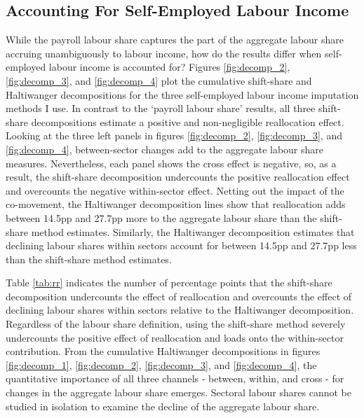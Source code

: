 \subsection{Accounting For Self-Employed Labour Income}

While the payroll labour share captures the part of the aggregate labour share accruing unambiguously to labour income, how do the results differ when self-employed labour income is accounted for? Figures \ref{fig:decomp_2}, \ref{fig:decomp_3}, and \ref{fig:decomp_4} plot the cumulative shift-share and Haltiwanger decompositions for the three self-employed labour income imputation methods I use. In contrast to the `payroll labour share' results, all three shift-share decompositions estimate a positive and non-negligible reallocation effect. Looking at the three left panels in figures \ref{fig:decomp_2}, \ref{fig:decomp_3}, and \ref{fig:decomp_4}, between-sector changes add to the aggregate labour share measures. Nevertheless, each panel shows the cross effect is negative, so, as a result, the shift-share decomposition undercounts the positive reallocation effect and overcounts the negative within-sector effect. Netting out the impact of the co-movement, the Haltiwanger decomposition lines show that reallocation adds between 14.5pp and 27.7pp more to the aggregate labour share than the shift-share method estimates. Similarly, the Haltiwanger decomposition estimates that declining labour shares within sectors account for between 14.5pp and 27.7pp less than the shift-share method estimates. 

Table \ref{tab:rr} indicates the number of percentage points that the shift-share decomposition undercounts the effect of reallocation and overcounts the effect of declining labour shares within sectors relative to the Haltiwanger decomposition. Regardless of the labour share definition, using the shift-share method severely undercounts the positive effect of reallocation and loads onto the within-sector contribution. From the cumulative Haltiwanger decompositions in figures \ref{fig:decomp_1}, \ref{fig:decomp_2}, \ref{fig:decomp_3}, and \ref{fig:decomp_4}, the quantitative importance of all three channels - between, within, and cross - for changes in the aggregate labour share emerges. Sectoral labour shares cannot be studied in isolation to examine the decline of the aggregate labour share. 




